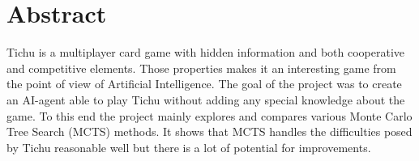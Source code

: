 \section*{Abstract}

Tichu is a multiplayer card game with hidden information and both cooperative and competitive elements. Those properties makes it an interesting game from the point of view of Artificial Intelligence. The goal of the project was to create an AI-agent able to play Tichu without adding any special knowledge about the game. To this end the project mainly explores and compares various Monte Carlo Tree Search (MCTS) methods.
It shows that MCTS handles the difficulties posed by Tichu reasonable well but there is a lot of potential for improvements.

\vskip0.5cm
